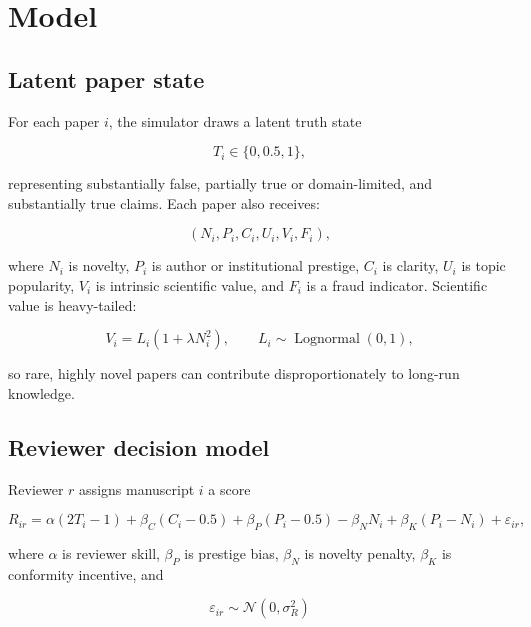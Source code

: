 \section{Model}

\subsection{Latent paper state}

For each paper $i$, the simulator draws a latent truth state

\begin{equation}
T_i \in \{0, 0.5, 1\},
\end{equation}

representing substantially false, partially true or domain-limited, and substantially true claims. Each paper also receives:

\begin{equation}
(N_i, P_i, C_i, U_i, V_i, F_i),
\end{equation}

where $N_i$ is novelty, $P_i$ is author or institutional prestige, $C_i$ is clarity, $U_i$ is topic popularity, $V_i$ is intrinsic scientific value, and $F_i$ is a fraud indicator. Scientific value is heavy-tailed:

\begin{equation}
V_i = L_i\left(1+\lambda N_i^2\right),
\qquad L_i \sim \operatorname{Lognormal}(0,1),
\end{equation}

so rare, highly novel papers can contribute disproportionately to long-run knowledge.

\subsection{Reviewer decision model}

Reviewer $r$ assigns manuscript $i$ a score

\begin{equation}
R_{ir} =
\alpha(2T_i-1)
+\beta_C(C_i-0.5)
+\beta_P(P_i-0.5)
-\beta_N N_i
+\beta_K(P_i-N_i)
+\varepsilon_{ir},
\end{equation}

where $\alpha$ is reviewer skill, $\beta_P$ is prestige bias, $\beta_N$ is novelty penalty, $\beta_K$ is conformity incentive, and

\begin{equation}
\varepsilon_{ir}\sim\mathcal{N}(0,\sigma_R^2)
\end{equation}

